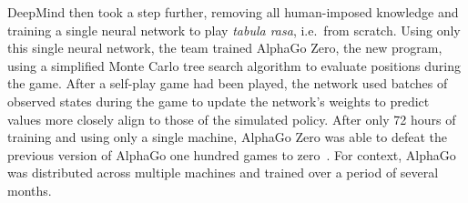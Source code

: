 DeepMind then took a step further,
removing all human-imposed knowledge and
training a single neural network to play \textit{tabula rasa}, i.e.\  from scratch.
%
Using only this single neural network,
the team trained AlphaGo Zero,
the new program,
using a simplified Monte Carlo tree search algorithm to evaluate positions
during the game.
%
After a self-play game had been played,
the network used batches of observed states during the game to update
the network's weights to predict values
more closely align to those of the simulated policy.
%
After only 72 hours of training and using only a single machine,
AlphaGo Zero was able to defeat the previous version of AlphaGo
one hundred games to zero~\cite{deepmind_alphago_zero}.
%
For context,
AlphaGo was distributed across multiple machines
and trained over a period of several months.

